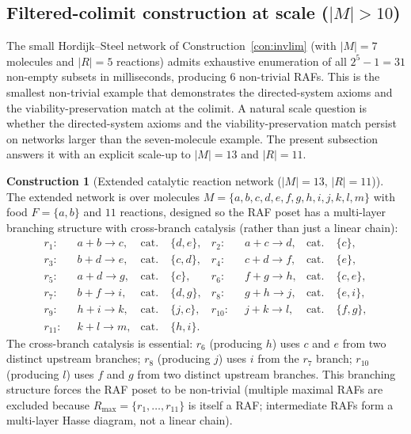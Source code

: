 \documentclass[11pt,a4paper]{article}
\theoremstyle{plain}
\theoremstyle{definition}
\newtheorem{construction}[theorem]{Construction}
\theoremstyle{remark}
\begin{document}
\subsection{Filtered-colimit construction at scale ($|M| > 10$)}
\label{sec:invlim-extended}

The small Hordijk--Steel network of
Construction~\ref{con:invlim} (with $|M|=7$ molecules and $|R|=5$
reactions) admits exhaustive enumeration of all $2^{5}-1=31$
non-empty subsets in milliseconds, producing $6$ non-trivial RAFs.
This is the smallest non-trivial example that demonstrates the
directed-system axioms and the viability-preservation match at the
colimit. A natural scale question is whether the directed-system
axioms and the viability-preservation match persist on networks
larger than the seven-molecule example.
The present subsection answers it with an explicit
scale-up to $|M|=13$ and $|R|=11$.

\begin{construction}[Extended catalytic reaction network ($|M|=13$,
$|R|=11$)]
\label{con:invlim-extended}
The extended network is over molecules
$M=\{a,b,c,d,e,f,g,h,i,j,k,l,m\}$ with food $F=\{a,b\}$ and $11$
reactions, designed so the RAF poset has a multi-layer branching
structure with cross-branch catalysis (rather than just a linear
chain):
\begin{equation}\label{eq:extended-rxn}
\begin{aligned}
  r_1:&\;\; a+b \to c, &\text{cat.}&\;\{d,e\}, &
  r_2:&\;\; a+c \to d, &\text{cat.}&\;\{c\}, \\
  r_3:&\;\; b+d \to e, &\text{cat.}&\;\{c,d\}, &
  r_4:&\;\; c+d \to f, &\text{cat.}&\;\{e\}, \\
  r_5:&\;\; a+d \to g, &\text{cat.}&\;\{c\}, &
  r_6:&\;\; f+g \to h, &\text{cat.}&\;\{c,e\}, \\
  r_7:&\;\; b+f \to i, &\text{cat.}&\;\{d,g\}, &
  r_8:&\;\; g+h \to j, &\text{cat.}&\;\{e,i\}, \\
  r_9:&\;\; h+i \to k, &\text{cat.}&\;\{j,c\}, &
  r_{10}:&\;\; j+k \to l, &\text{cat.}&\;\{f,g\}, \\
  r_{11}:&\;\; k+l \to m, &\text{cat.}&\;\{h,i\}. & &
\end{aligned}
\end{equation}
The cross-branch catalysis is essential: $r_6$ (producing $h$) uses
$c$ and $e$ from two distinct upstream branches; $r_8$ (producing
$j$) uses $i$ from the $r_7$ branch; $r_{10}$ (producing $l$) uses
$f$ and $g$ from two distinct upstream branches. This branching
structure forces the RAF poset to be non-trivial (multiple maximal
RAFs are excluded because $R_{\max}=\{r_1,\ldots,r_{11}\}$ is itself
a RAF; intermediate RAFs form a multi-layer Hasse diagram, not a
linear chain).
\end{construction}
\end{document}
